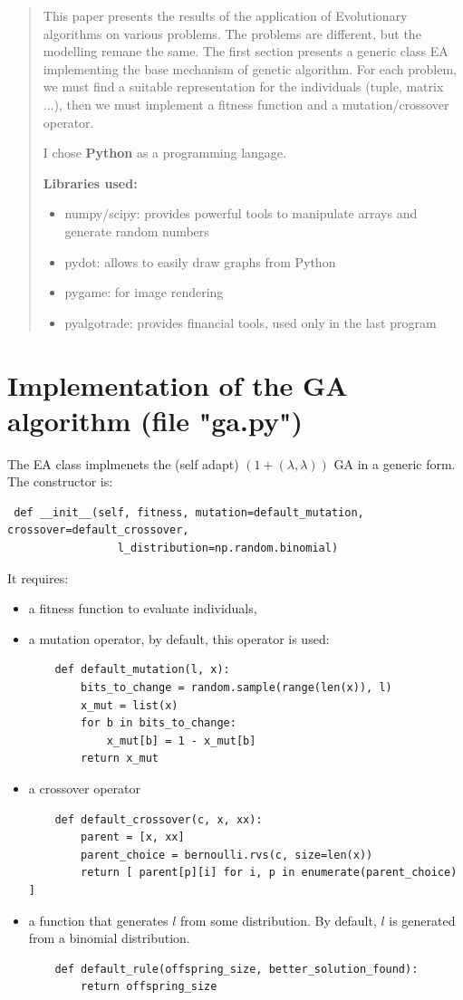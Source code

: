 \documentclass{article}
\begin{document}



\begin{abstract}
This paper presents the results of the application of Evolutionary algorithms on various problems. The problems are different, but the modelling remane the same. The first section presents a generic class EA implementing the base mechanism of genetic algorithm. For each problem, we must find a suitable representation for the individuals (tuple, matrix ...), then we must implement a fitness function and a mutation/crossover operator.

I chose \textbf{Python} as a programming langage.

\textbf{Libraries used:}
\begin{itemize}
	\item numpy/scipy: provides powerful tools to manipulate arrays and generate random numbers
	\item pydot: allows to easily draw  graphs from Python
	\item pygame: for image rendering
	\item pyalgotrade: provides financial tools, used only in the last program
\end{itemize}
\end{abstract}

\tableofcontents

\section{Implementation of the GA algorithm (file "ga.py") }

The EA class implmenets the (self adapt) $(1+(\lambda, \lambda))$ GA in a generic form. The constructor is:
\begin{verbatim}
 def __init__(self, fitness, mutation=default_mutation, crossover=default_crossover, 
                 l_distribution=np.random.binomial)
\end{verbatim}
It requires:
\begin{itemize}
	\item a fitness function to evaluate individuals,
	\item a mutation operator, by default, this operator is used:
\begin{verbatim}
	def default_mutation(l, x):
		bits_to_change = random.sample(range(len(x)), l)
		x_mut = list(x)
		for b in bits_to_change:
			x_mut[b] = 1 - x_mut[b]
		return x_mut
\end{verbatim}
	\item a crossover operator
\begin{verbatim}
	def default_crossover(c, x, xx):
		parent = [x, xx]
		parent_choice = bernoulli.rvs(c, size=len(x))
		return [ parent[p][i] for i, p in enumerate(parent_choice) ]
\end{verbatim}
	\item a function that generates $l$ from some distribution. By default, $l$ is generated from a binomial distribution.
\begin{verbatim}
	def default_rule(offspring_size, better_solution_found):
		return offspring_size
\end{verbatim}
\end{itemize}
\end{document}
